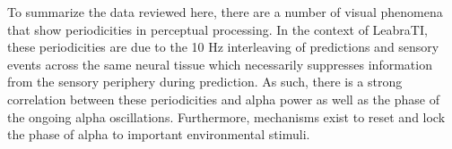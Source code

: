 \documentclass[dwyatte_dissertation.tex]{subfiles}
\begin{document}
To summarize the data reviewed here, there are a number of visual phenomena that show periodicities in perceptual processing. In the context of LeabraTI, these periodicities are due to the 10 Hz interleaving of predictions and sensory events across the same neural tissue which necessarily suppresses information from the sensory periphery during prediction. As such, there is a strong correlation between these periodicities and alpha power as well as the phase of the ongoing alpha oscillations. Furthermore, mechanisms exist to reset and lock the phase of alpha to important environmental stimuli. 

%
%
\end{document}
